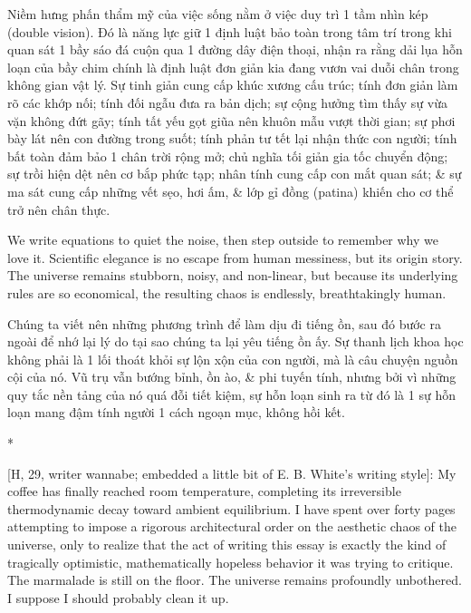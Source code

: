 \documentclass[11pt]{article}
\begin{document}
Niềm hưng phấn thẩm mỹ của việc sống nằm ở việc duy trì 1 tầm nhìn kép (double vision). Đó là năng lực giữ 1 định luật bảo toàn trong tâm trí trong khi quan sát 1 bầy sáo đá cuộn qua 1 đường dây điện thoại, nhận ra rằng dải lụa hỗn loạn của bầy chim chính là định luật đơn giản kia đang vươn vai duỗi chân trong không gian vật lý. Sự tinh giản cung cấp khúc xương cấu trúc; tính đơn giản làm rõ các khớp nối; tính đối ngẫu đưa ra bản dịch; sự cộng hưởng tìm thấy sự vừa vặn không đứt gãy; tính tất yếu gọt giũa nên khuôn mẫu vượt thời gian; sự phơi bày lát nên con đường trong suốt; tính phản tư tết lại nhận thức con người; tính bất toàn đảm bảo 1 chân trời rộng mở; chủ nghĩa tối giản gia tốc chuyển động; sự trồi hiện dệt nên cơ bắp phức tạp; nhân tính cung cấp con mắt quan sát; \& sự ma sát cung cấp những vết sẹo, hơi ấm, \& lớp gỉ đồng (patina) khiến cho cơ thể trở nên chân thực.

We write equations to quiet the noise, then step outside to remember why we love it. Scientific elegance is no escape from human messiness, but its origin story. The universe remains stubborn, noisy, and non-linear, but because its underlying rules are so economical, the resulting chaos is endlessly, breathtakingly human.

Chúng ta viết nên những phương trình để làm dịu đi tiếng ồn, sau đó bước ra ngoài để nhớ lại lý do tại sao chúng ta lại yêu tiếng ồn ấy. Sự thanh lịch khoa học không phải là 1 lối thoát khỏi sự lộn xộn của con người, mà là câu chuyện nguồn cội của nó. Vũ trụ vẫn bướng bỉnh, ồn ào, \& phi tuyến tính, nhưng bởi vì những quy tắc nền tảng của nó quá đỗi tiết kiệm, sự hỗn loạn sinh ra từ đó là 1 sự hỗn loạn mang đậm tính người 1 cách ngoạn mục, không hồi kết.

\vspace{1cm}
\begin{center}
    * \quad * \quad *
\end{center}
\vspace{0.5cm}

\textsf{[H, 29, writer wannabe; embedded a little bit of E. B. White's writing style]:} My coffee has finally reached room temperature, completing its irreversible thermodynamic decay toward ambient equilibrium. I have spent over forty pages attempting to impose a rigorous architectural order on the aesthetic chaos of the universe, only to realize that the act of writing this essay is exactly the kind of tragically optimistic, mathematically hopeless behavior it was trying to critique. The marmalade is still on the floor. The universe remains profoundly unbothered. I suppose I should probably clean it up.
\end{document}
